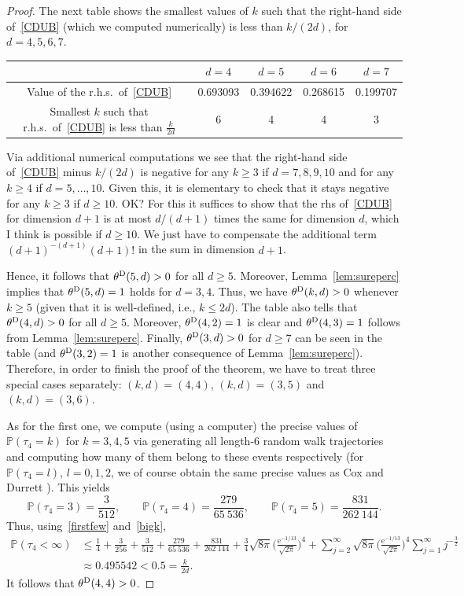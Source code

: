 \documentclass{article}
\newcommand{\e}{\mathrm e}
\theoremstyle{definition}
\renewcommand{\P}{\mathbb{P}}
\newcommand{\1}{\mathbbm{1}}
\newcommand{\0}{\mathbf{o}}
\begin{document}
\begin{proof}
The next table shows the smallest values of $k$ such that the right-hand side of~\eqref{CDUB} (which we computed numerically) is less than $k/(2d)$, for $d=4,5,6,7$.
\begin{center}
    \begin{tabular}{|c|c|c|c|c|} \hline
       &  $d=4$ & $d=5$ & $d=6$ & $d=7$ \\ \hline
        Value of the r.h.s.\ of~\eqref{CDUB}   & 0.693093  & 0.394622  & 0.268615 & 0.199707  \\ \hline
         Smallest $k$ such that r.h.s.\ of~\eqref{CDUB} is less than $\tfrac{k}{2d} $ & 6 & 4 & 4 & 3 \\ \hline 
    \end{tabular}
\end{center}
Via additional numerical computations we see that the right-hand side of~\eqref{CDUB} minus $k/(2d)$ is negative for any $k\geq 3$ if $d=7,8,9,10$ and for any $k\geq 4$ if $d=5,\ldots,10$. Given this, it is elementary to check that it stays negative for any $k \geq 3$ if $d \geq 10$.  \color{red} OK? For this it suffices to show that the rhs of~\eqref{CDUB} for dimension $d+1$ is at most $d/(d+1)$ times the same for dimension $d$, which I think is possible if $d \geq 10$. We just have to compensate the additional term $(d+1)^{-(d+1)} (d+1)!$ in the sum in dimension $d+1$. \color{black} 

Hence, it follows that $\theta^{\rm D}(5,d) >0$ for all $d \geq 5$. Moreover, Lemma~\ref{lem:sureperc} implies that $\theta^{\rm D}(5,d)=1$ holds for $d=3,4$. Thus, we have $\theta^{\rm D}(k,d) >0$ whenever $k\geq 5$ (given that it is well-defined, i.e., $k\leq 2d$). The table also tells that  $\theta^{\rm D}(4,d)>0$ for all $d \geq 5$. Moreover, $\theta^{\rm D}(4,2)=1$ is clear and $\theta^{\rm D}(4,3)=1$ follows from Lemma~\ref{lem:sureperc}. Finally, $\theta^{\rm D}(3,d)>0$ for $d \geq 7$ can be seen in the table (and $\theta^{\rm D}(3,2)=1$ is another consequence of Lemma~\ref{lem:sureperc}). Therefore, in order to finish the proof of the theorem, we have to treat three special cases separately: $(k,d)=(4,4)$, $(k,d)=(3,5)$ and $(k,d)=(3,6)$. 

As for the first one, we compute (using a computer) the precise values of $\P(\tau_4=k)$ for $k=3,4,5$ via generating all length-6 random walk trajectories and computing how many of them belong to these events respectively (for $\P(\tau_4=l)$, $l=0,1,2$, we of course obtain the same precise values as \color{red} Cox and Durrett \color{black}). This yields
\[ \P(\tau_4=3)=\frac{3}{512}, \qquad \P(\tau_4=4)=\frac{279}{65\ 536}, \qquad \P(\tau_4=5)=\frac{831}{262\ 144}. \]
Thus, using~\eqref{firstfew} and~\eqref{bigk},
\[ \begin{aligned} \P(\tau_4<\infty) & \leq \frac{1}{4} + \frac{3}{256} + \frac{3}{512} + \frac{279}{65\ 536} + \frac{831}{262\ 144} + \frac{3}{4} \sqrt{8\pi} \Big( \frac{\e^{-1/13}}{\sqrt{2\pi}} \Big)^4 + \sum_{j=2}^{\infty} \sqrt{8\pi} \Big( \frac{\e^{-1/13}}{\sqrt{2\pi}} \Big)^4 \sum_{j=1}^{\infty} j^{-\frac{3}{2}} \\ & \approx 0.495542 < 0.5 = \frac{k}{2d}. \end{aligned}\]
It follows that $\theta^{\rm D}(4,4)>0$.


\end{proof}
\end{document}

